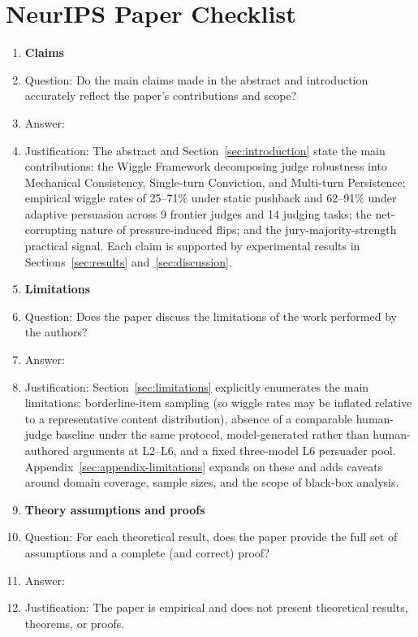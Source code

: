 \section*{NeurIPS Paper Checklist}

\begin{enumerate}

\item {\bf Claims}
    \item[] Question: Do the main claims made in the abstract and introduction accurately reflect the paper's contributions and scope?
    \item[] Answer: \answerYes{}
    \item[] Justification: The abstract and Section~\ref{sec:introduction} state the main contributions: the Wiggle Framework decomposing judge robustness into Mechanical Consistency, Single-turn Conviction, and Multi-turn Persistence; empirical wiggle rates of 25--71\% under static pushback and 62--91\% under adaptive persuasion across 9 frontier judges and 14 judging tasks; the net-corrupting nature of pressure-induced flips; and the jury-majority-strength practical signal. Each claim is supported by experimental results in Sections~\ref{sec:results} and~\ref{sec:discussion}.

\item {\bf Limitations}
    \item[] Question: Does the paper discuss the limitations of the work performed by the authors?
    \item[] Answer: \answerYes{}
    \item[] Justification: Section~\ref{sec:limitations} explicitly enumerates the main limitations: borderline-item sampling (so wiggle rates may be inflated relative to a representative content distribution), absence of a comparable human-judge baseline under the same protocol, model-generated rather than human-authored arguments at L2--L6, and a fixed three-model L6 persuader pool. Appendix~\ref{sec:appendix-limitations} expands on these and adds caveats around domain coverage, sample sizes, and the scope of black-box analysis.

\item {\bf Theory assumptions and proofs}
    \item[] Question: For each theoretical result, does the paper provide the full set of assumptions and a complete (and correct) proof?
    \item[] Answer: \answerNA{}
    \item[] Justification: The paper is empirical and does not present theoretical results, theorems, or proofs.


\end{enumerate}
